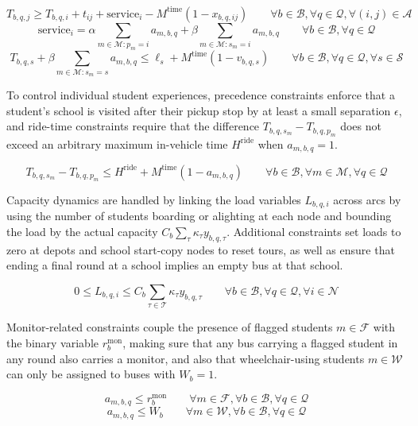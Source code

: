 \[
T_{b,q,j} \geq T_{b,q,i} + t_{ij}
+ \mathrm{service}_i
- M^{\mathrm{time}}\left(1-x_{b,q,ij}\right) \qquad \forall b\in\mathcal{B},\forall q\in\mathcal{Q},\forall \left(i,j\right)\in\mathcal{A}
\]
\[
\mathrm{service}_i=\alpha \sum_{m\in\mathcal{M}:p_m=i} a_{m,b,q}
+ \beta \sum_{m\in\mathcal{M}:s_m=i} a_{m,b,q} \qquad \forall b\in\mathcal{B},\forall q\in\mathcal{Q}
\]
\[
T_{b,q,s} + \beta\sum_{m\in\mathcal{M}:s_m=s} a_{m,b,q} \leq \ell_s + M^{\mathrm{time}}\left(1-v_{b,q,s}\right) \qquad \forall b\in\mathcal{B},\forall q\in\mathcal{Q},\forall s\in\mathcal{S}
\]

To control individual student experiences, precedence constraints enforce that a student’s school is visited after their pickup stop by at least a small separation $\epsilon$, and ride-time constraints require that the difference $T_{b,q,s_m}-T_{b,q,p_m}$ does not exceed an arbitrary maximum in-vehicle time $H^{\mathrm{ride}}$ when $a_{m,b,q}=1$.

\[
T_{b,q,s_m} - T_{b,q,p_m}
\leq H^{\mathrm{ride}} + M^{\mathrm{time}}\left(1-a_{m,b,q}\right) \qquad \forall b\in\mathcal{B},\forall m\in\mathcal{M},\forall q\in\mathcal{Q}
\]

Capacity dynamics are handled by linking the load variables $L_{b,q,i}$ across arcs by using the number of students boarding or alighting at each node and bounding the load by the actual capacity $C_b\sum_{\tau}\kappa_\tau y_{b,q,\tau}$. Additional constraints set loads to zero at depots and school start-copy nodes to reset tours, as well as ensure that ending a final round at a school implies an empty bus at that school. 

\[
0 \leq L_{b,q,i} \leq C_b \sum_{\tau\in\mathcal{T}} \kappa_{\tau} y_{b,q,\tau} \qquad \forall b\in\mathcal{B},\forall q\in\mathcal{Q},\forall i\in\mathcal{N}
\]

Monitor-related constraints couple the presence of flagged students $m\in\mathcal{F}$ with the binary variable $r_b^{\mathrm{mon}}$, making sure that any bus carrying a flagged student in any round also carries a monitor, and also that wheelchair-using students $m\in\mathcal{W}$ can only be assigned to buses with $W_b=1$.

\[
a_{m,b,q} \leq r_b^{\mathrm{mon}} \qquad \forall m\in\mathcal{F},\forall b\in\mathcal{B},\forall q\in\mathcal{Q}
\]
\[
a_{m,b,q} \leq W_b \qquad \forall m\in\mathcal{W},\forall b\in\mathcal{B},\forall q\in\mathcal{Q}
\]

